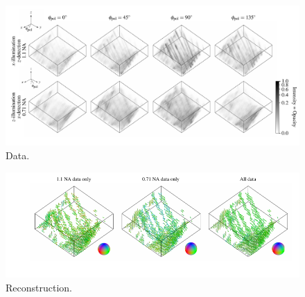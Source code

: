 \documentclass[letterpaper,10pt]{article}
\begin{document}
\begin{figure}[htbp]
  \centering
  \includegraphics[width=17cm]{figs/roi2/data.pdf}
\caption{Data.}
\end{figure}

\begin{figure}[htbp]
  \centering
  \includegraphics[width=17cm]{figs/roi2/recon.pdf}
\caption{Reconstruction.}
\end{figure}



{}

\end{document}
